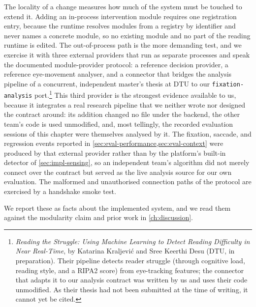 The locality of a change measures how much of the system must be touched to extend it.
Adding an in-process intervention module requires one registration entry, because the runtime resolves modules from a registry by identifier and never names a concrete module, so no existing module and no part of the reading runtime is edited.
The out-of-process path is the more demanding test, and we exercise it with three external providers that run as separate processes and speak the documented module-provider protocol: a reference decision provider, a reference eye-movement analyser, and a connector that bridges the analysis pipeline of a concurrent, independent master's thesis at DTU to our \texttt{fixation-analysis} port.\footnote{\emph{Reading the Struggle: Using Machine Learning to Detect Reading Difficulty in Near Real-Time}, by Katarina Kraljević and Sree Keerthi Desu (DTU, in preparation). Their pipeline detects reader struggle (through cognitive load, reading style, and a RIPA2 score) from eye-tracking features; the connector that adapts it to our analysis contract was written by us and uses their code unmodified. As their thesis had not been submitted at the time of writing, it cannot yet be cited.}
This third provider is the strongest evidence available to us, because it integrates a real research pipeline that we neither wrote nor designed the contract around: its addition changed no file under the backend, the other team's code is used unmodified, and, most tellingly, the recorded evaluation sessions of this chapter were themselves analysed by it.
The fixation, saccade, and regression events reported in \cref{sec:eval-performance,sec:eval-context} were produced by that external provider rather than by the platform's built-in detector of \cref{sec:impl-sensing}, so an independent team's algorithm did not merely connect over the contract but served as the live analysis source for our own evaluation.
The malformed and unauthorised connection paths of the protocol are exercised by a handshake smoke test.

We report these as facts about the implemented system, and we read them against the modularity claim and prior work in \cref{ch:discussion}.

